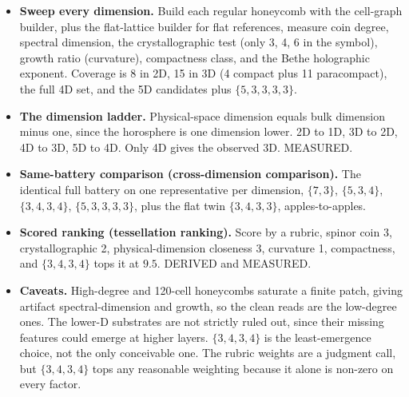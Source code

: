 \begin{itemize}
  \item \textbf{Sweep every dimension.} Build each regular honeycomb with the cell-graph builder, plus
  the flat-lattice builder for flat references, measure coin degree, spectral dimension, the
  crystallographic test (only 3, 4, 6 in the symbol), growth ratio (curvature), compactness class, and the Bethe
  holographic exponent. Coverage is 8 in 2D, 15 in 3D (4 compact plus 11 paracompact), the full 4D set, and the 5D
  candidates plus $\{5,3,3,3,3\}$.
  \item \textbf{The dimension ladder.} Physical-space dimension equals bulk dimension minus one, since the
  horosphere is one dimension lower. 2D to 1D, 3D to 2D, 4D to 3D, 5D to 4D. Only 4D gives the observed 3D.
  MEASURED.
  \item \textbf{Same-battery comparison (cross-dimension comparison).} The identical full battery on one
  representative per dimension, $\{7,3\}$, $\{5,3,4\}$, $\{3,4,3,4\}$, $\{5,3,3,3,3\}$, plus the flat twin
  $\{3,4,3,3\}$, apples-to-apples.
  \item \textbf{Scored ranking (tessellation ranking).} Score by a rubric, spinor coin 3,
  crystallographic 2, physical-dimension closeness 3, curvature 1, compactness, and $\{3,4,3,4\}$ tops it at
  $9.5$. DERIVED and MEASURED.
  \item \textbf{Caveats.} High-degree and 120-cell honeycombs saturate a finite patch, giving artifact
  spectral-dimension and growth, so the clean reads are the low-degree ones. The lower-D substrates are not
  strictly ruled out, since their missing features could emerge at higher layers. $\{3,4,3,4\}$ is the
  least-emergence choice, not the only conceivable one. The rubric weights are a judgment call, but $\{3,4,3,4\}$
  tops any reasonable weighting because it alone is non-zero on every factor.
\end{itemize}
